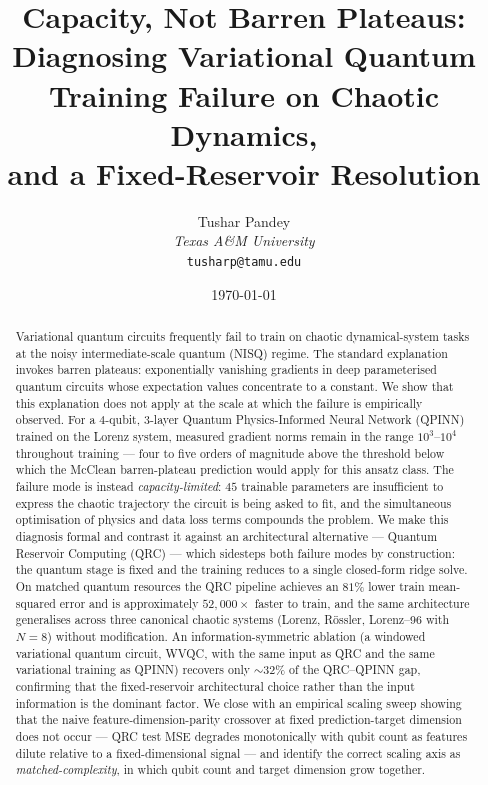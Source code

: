 \documentclass[11pt,a4paper]{article}
\title{Capacity, Not Barren Plateaus:\\
Diagnosing Variational Quantum Training Failure on Chaotic Dynamics,\\
and a Fixed-Reservoir Resolution}
\author{
    Tushar Pandey\\
    \textit{Texas A\&M University}\\
    \texttt{tusharp@tamu.edu}
}
\date{\today}
\begin{document}
\maketitle

\begin{abstract}
Variational quantum circuits frequently fail to train on chaotic
dynamical-system tasks at the noisy intermediate-scale quantum (NISQ)
regime. The standard explanation invokes barren plateaus: exponentially
vanishing gradients in deep parameterised quantum circuits whose
expectation values concentrate to a constant. We show that this
explanation does not apply at the scale at which the failure is
empirically observed.
For a $4$-qubit, $3$-layer Quantum Physics-Informed Neural Network
(QPINN) trained on the Lorenz system, measured gradient norms remain
in the range $10^3$--$10^4$ throughout training --- four to five orders
of magnitude above the threshold below which the McClean barren-plateau
prediction would apply for this ansatz class.
The failure mode is instead \emph{capacity-limited}: $45$ trainable
parameters are insufficient to express the chaotic trajectory the
circuit is being asked to fit, and the simultaneous optimisation of
physics and data loss terms compounds the problem.
We make this diagnosis formal and contrast it against an architectural
alternative --- Quantum Reservoir Computing (QRC) --- which sidesteps
both failure modes by construction: the quantum stage is fixed and the
training reduces to a single closed-form ridge solve.
On matched quantum resources the QRC pipeline achieves an $81\%$ lower
train mean-squared error and is approximately $52{,}000\times$ faster
to train, and the same architecture generalises across three canonical
chaotic systems (Lorenz, R\"{o}ssler, Lorenz--96 with $N=8$) without
modification.
An information-symmetric ablation (a windowed variational quantum
circuit, WVQC, with the same input as QRC and the same variational
training as QPINN) recovers only $\sim\!32\%$ of the QRC--QPINN gap,
confirming that the fixed-reservoir architectural choice rather than
the input information is the dominant factor.
We close with an empirical scaling sweep showing that the naive
feature-dimension-parity crossover at fixed prediction-target
dimension does not occur --- QRC test MSE degrades monotonically with
qubit count as features dilute relative to a fixed-dimensional signal
--- and identify the correct scaling axis as
\emph{matched-complexity}, in which qubit count and target dimension
grow together.
\end{abstract}
\end{document}

